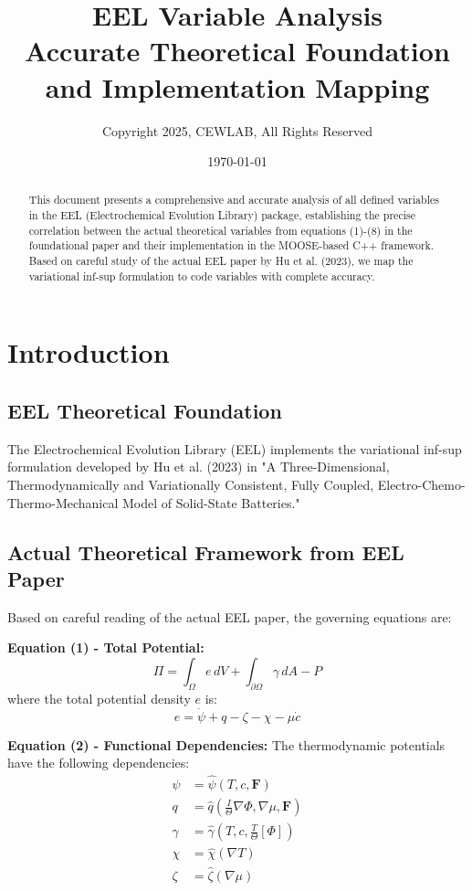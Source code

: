 \documentclass[11pt,a4paper]{article}
\title{\textbf{EEL Variable Analysis} \\ 
       \large Accurate Theoretical Foundation and Implementation Mapping}
\author{Copyright 2025, CEWLAB, All Rights Reserved}
\date{\today}
\begin{document}
\maketitle

\begin{abstract}
This document presents a comprehensive and accurate analysis of all defined variables in the EEL (Electrochemical Evolution Library) package, establishing the precise correlation between the actual theoretical variables from equations (1)-(8) in the foundational paper and their implementation in the MOOSE-based C++ framework. Based on careful study of the actual EEL paper by Hu et al. (2023), we map the variational inf-sup formulation to code variables with complete accuracy.
\end{abstract}

\tableofcontents
\newpage

\section{Introduction}

\subsection{EEL Theoretical Foundation}

The Electrochemical Evolution Library (EEL) implements the variational inf-sup formulation developed by Hu et al. (2023) in "A Three-Dimensional, Thermodynamically and Variationally Consistent, Fully Coupled, Electro-Chemo-Thermo-Mechanical Model of Solid-State Batteries."

\subsection{Actual Theoretical Framework from EEL Paper}

Based on careful reading of the actual EEL paper, the governing equations are:

\textbf{Equation (1) - Total Potential:}
\begin{equation}
\Pi = \int_\Omega e \, dV + \int_{\partial\Omega} \gamma \, dA - P
\label{eq:total_potential}
\end{equation}
where the total potential density $e$ is:
\begin{equation}
e = \dot{\psi} + q - \zeta - \chi - \mu\dot{c}
\label{eq:potential_density}
\end{equation}

\textbf{Equation (2) - Functional Dependencies:}
The thermodynamic potentials have the following dependencies:
\begin{align}
\psi &= \hat{\psi}(T, c, \mathbf{F}) \label{eq:psi}\\
q &= \hat{q}\left(\frac{I}{\Theta}\nabla\Phi, \nabla\mu, \mathbf{F}\right) \label{eq:q}\\
\gamma &= \hat{\gamma}\left(T, c, \frac{T}{\Theta}[\Phi]\right) \label{eq:gamma}\\
\chi &= \hat{\chi}(\nabla T) \label{eq:chi}\\
\zeta &= \hat{\zeta}(\nabla\mu) \label{eq:zeta}
\end{align}
\end{document}
